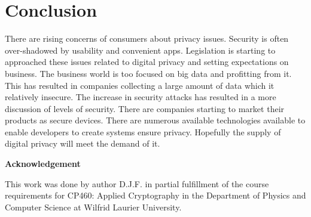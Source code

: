 \documentclass[12pt]{article}
\begin{document}
\section{Conclusion}\label{sec:conclusion}
There are rising concerns of consumers about privacy issues. Security is often over-shadowed by usability and convenient apps. Legislation is starting to approached these issues related to digital privacy and setting expectations on business. The business world is too focused on big data and profitting from it. This has resulted in companies collecting a large amount of data which it relatively insecure. The increase in security attacks has resulted in a more discussion of levels of security. There are companies starting to market their products as secure devices. There are numerous available technologies available to enable developers to create systems ensure privacy. Hopefully the supply of digital privacy will meet the demand of it.

\begin{center}
{\bf Acknowledgement}
\end{center}
This work was done by author D.J.F. in partial fulfillment of the course requirements for CP460: Applied Cryptography in the Department of Physics and Computer Science at Wilfrid Laurier University.
\end{document}
